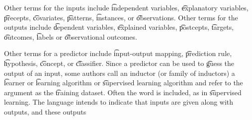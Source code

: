 Other terms for the inputs include \t{independent variables}, \t{explanatory variables}, \t{precepts}, \t{covariates}, \t{patterns}, \t{instances}, or \t{observations}.
Other terms for the outputs include \t{dependent variables}, \t{explained variables}, \t{postcepts}, \t{targets}, \t{outcomes}, \t{labels} or \t{observational outcomes}.

Other terms for a predictor include \t{input-output} mapping, \t{prediction rule}, \t{hypothesis}, \t{concept}, or \t{classifier}.
Since a predictor can be used to \t{guess} the output of an input, some authors call an inductor (or family of inductors) a \t{learner} or \t{learning algorithm} or \t{supervised learning algorithm} and refer to the argument as the \t{training dataset}.
Often the word  is included, as in \t{supervised learning}.
The language intends to indicate that inputs are given along with outputs, and these outputs 
